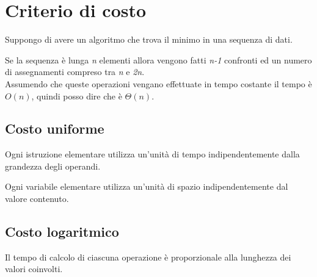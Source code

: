 \section{Criterio di costo}
Suppongo di avere un algoritmo che trova il minimo in una sequenza di dati.

Se la sequenza è lunga {\emph{n}} elementi allora vengono fatti 
{\emph{n-1}} confronti ed un numero di assegnamenti compreso tra {\emph{n}} e {\emph{2n}}.\\
Assumendo che queste operazioni vengano effettuate in tempo costante il tempo è
$O(n)$, quindi posso dire che è $\Theta(n)$.\\

\subsection{Costo uniforme}
Ogni istruzione elementare utilizza un'unità di tempo indipendentemente 
dalla grandezza degli operandi.\newline

\noindent Ogni variabile elementare utilizza un'unità di spazio indipendentemente dal 
valore contenuto.

\subsection{Costo logaritmico}

Il tempo di calcolo di ciascuna operazione è proporzionale alla lunghezza dei
valori coinvolti.

\clearpage